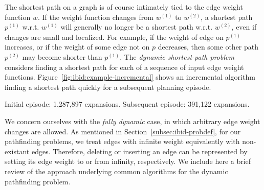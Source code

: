 The shortest path on a graph is of course intimately tied to
the edge weight function $w$.
If the weight function changes from $w^{(1)}$ to $w^{(2)}$,
a shortest path $p^{(1)}$ w.r.t. $w^{(1)}$
will generally no longer be a shortest path w.r.t. $w^{(2)}$,
even if changes are small and localized.
For example,
if the weight of edge on $p^{(1)}$ increases,
or if the weight of some edge not on $p$ decreases,
then some other path $p^{(2)}$ may become shorter than $p^{(1)}$.
The \emph{dynamic shortest-path problem}
considers finding a shortest path
for each of a sequence of input edge weight functions.
Figure~\ref{fig:ibid:example-incremental}
shows an incremental algorithm finding a shortest path quickly
for a subsequent planning episode.

\begin{marginfigure}%
   \centering%
   
   \caption{Initial episode: 1,287,897 expansions.
      Subsequent episode: 391,122 expansions.}%
   \label{fig:ibid:example-incremental}%
\end{marginfigure}

We concern ourselves with the \emph{fully dynamic} case,
in which arbitrary edge weight changes are allowed.
As mentioned in Section~\ref{subsec:ibid-probdef},
for our pathfinding problems,
we treat edges with infinite weight equivalently with non-existant
edges.
Therefore,
deleting or inserting an edge can be represented by
setting its edge weight to or from infinity, respectively.
We include here a brief review of the approach underlying common
algorithms for the dynamic pathfinding problem.


